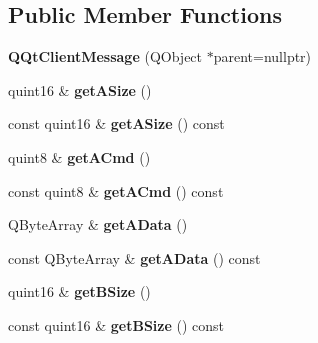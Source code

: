 \subsection*{Public Member Functions}
\begin{DoxyCompactItemize}
\item 
\mbox{\label{class_q_qt_client_message_a67f1abacab48e7a010e7917ac710fd8d}} 
{\bfseries Q\+Qt\+Client\+Message} (Q\+Object $\ast$parent=nullptr)
\item 
\mbox{\label{class_q_qt_client_message_a10ebff0e0a545e13126c95cf3f737731}} 
quint16 \& {\bfseries get\+A\+Size} ()
\item 
\mbox{\label{class_q_qt_client_message_a44799f4a1350df962cfa134cc1bad3e3}} 
const quint16 \& {\bfseries get\+A\+Size} () const
\item 
\mbox{\label{class_q_qt_client_message_ab4cd3555ad2b79cdeae10d3638bd65cf}} 
quint8 \& {\bfseries get\+A\+Cmd} ()
\item 
\mbox{\label{class_q_qt_client_message_a046868d07184729f5fea38898f412749}} 
const quint8 \& {\bfseries get\+A\+Cmd} () const
\item 
\mbox{\label{class_q_qt_client_message_aa9cc33f4aacbd809af305d17c8a158ba}} 
Q\+Byte\+Array \& {\bfseries get\+A\+Data} ()
\item 
\mbox{\label{class_q_qt_client_message_a62f36a0d5e7271ab4daab8eab786c7c1}} 
const Q\+Byte\+Array \& {\bfseries get\+A\+Data} () const
\item 
\mbox{\label{class_q_qt_client_message_afcf77e80321162f6b711669928370072}} 
quint16 \& {\bfseries get\+B\+Size} ()
\item 
\mbox{\label{class_q_qt_client_message_aceb9429dc5a702c4dde875055c57ed11}} 
const quint16 \& {\bfseries get\+B\+Size} () const
\item 
\mbox{\label{class_q_qt_client_message_a7a305bf15bda1d598f5c1929a8da9c32}} 

\end{DoxyCompactItemize}
